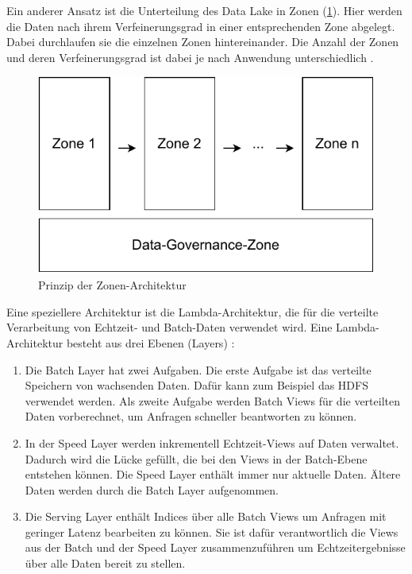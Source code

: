 Ein anderer Ansatz ist die Unterteilung des Data Lake in Zonen (\cref{fig:datalake-zones}).
Hier werden die Daten nach ihrem Verfeinerungsgrad in einer entsprechenden Zone abgelegt.
Dabei durchlaufen sie die einzelnen Zonen hintereinander.
Die Anzahl der Zonen und deren Verfeinerungsgrad ist dabei je nach Anwendung unterschiedlich \parencite{dl-zones}.

\begin{figure}
    \centering
    \includegraphics[width=.8\textwidth]{Grafiken/Grundlagen-Zones.pdf}
    \caption{Prinzip der Zonen-Architektur}
    \label{fig:datalake-zones}
\end{figure}

Eine speziellere Architektur ist die Lambda-Architektur, die für die verteilte Verarbeitung von Echtzeit- und Batch-Daten verwendet wird.
Eine Lambda-Architektur besteht aus drei Ebenen (Layers) \parencite{lambda-arch}: \begin{enumerate}
    \item Die Batch Layer hat zwei Aufgaben.
          Die erste Aufgabe ist das verteilte Speichern von wachsenden Daten.
          Dafür kann zum Beispiel das HDFS verwendet werden.
          Als zweite Aufgabe werden Batch Views für die verteilten Daten vorberechnet, um Anfragen schneller beantworten zu können.
    \item In der Speed Layer werden inkrementell Echtzeit-Views auf Daten verwaltet.
          Dadurch wird die Lücke gefüllt, die bei den Views in der Batch-Ebene entstehen können.
          Die Speed Layer enthält immer nur aktuelle Daten.
          Ältere Daten werden durch die Batch Layer aufgenommen.
    \item Die Serving Layer enthält Indices über alle Batch Views um Anfragen mit geringer Latenz bearbeiten zu können. Sie ist dafür verantwortlich die Views aus der Batch und der Speed Layer zusammenzuführen um Echtzeitergebnisse über alle Daten bereit zu stellen.
\end{enumerate}

